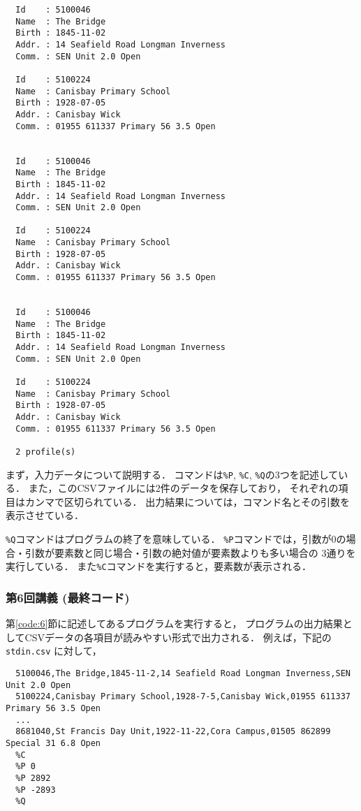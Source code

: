 \documentclass[autodetect-engine,dvi=dvipdfmx,ja=standard,
               a4j,11pt]{bxjsarticle}
\begin{document}
{\fontsize{10pt}{11pt} \selectfont
 \begin{verbatim}
  Id    : 5100046
  Name  : The Bridge
  Birth : 1845-11-02
  Addr. : 14 Seafield Road Longman Inverness
  Comm. : SEN Unit 2.0 Open

  Id    : 5100224
  Name  : Canisbay Primary School
  Birth : 1928-07-05
  Addr. : Canisbay Wick
  Comm. : 01955 611337 Primary 56 3.5 Open


  Id    : 5100046
  Name  : The Bridge
  Birth : 1845-11-02
  Addr. : 14 Seafield Road Longman Inverness
  Comm. : SEN Unit 2.0 Open

  Id    : 5100224
  Name  : Canisbay Primary School
  Birth : 1928-07-05
  Addr. : Canisbay Wick
  Comm. : 01955 611337 Primary 56 3.5 Open


  Id    : 5100046
  Name  : The Bridge
  Birth : 1845-11-02
  Addr. : 14 Seafield Road Longman Inverness
  Comm. : SEN Unit 2.0 Open

  Id    : 5100224
  Name  : Canisbay Primary School
  Birth : 1928-07-05
  Addr. : Canisbay Wick
  Comm. : 01955 611337 Primary 56 3.5 Open

  2 profile(s)
 \end{verbatim}
}

まず，入力データについて説明する．
コマンドは\verb|%P|, \verb|%C|, \verb|%Q|の3つを記述している．
また，このCSVファイルには2件のデータを保存しており，
それぞれの項目はカンマで区切られている．
出力結果については，コマンド名とその引数を表示させている．

\verb|%Q|コマンドはプログラムの終了を意味している．
\verb|%P|コマンドでは，引数が0の場合・引数が要素数と同じ場合・引数の絶対値が要素数よりも多い場合の
3通りを実行している．
また\verb|%C|コマンドを実行すると，要素数が表示される．

\subsubsection{第6回講義 (最終コード)}

第\ref{code:6}節に記述してあるプログラムを実行すると，
プログラムの出力結果としてCSVデータの各項目が読みやすい形式で出力される．
例えば，下記の \verb|stdin.csv| に対して，

{\fontsize{10pt}{11pt} \selectfont
 \begin{verbatim}
  5100046,The Bridge,1845-11-2,14 Seafield Road Longman Inverness,SEN Unit 2.0 Open
  5100224,Canisbay Primary School,1928-7-5,Canisbay Wick,01955 611337 Primary 56 3.5 Open
  ...
  8681040,St Francis Day Unit,1922-11-22,Cora Campus,01505 862899 Special 31 6.8 Open
  %C
  %P 0
  %P 2892
  %P -2893
  %Q
 \end{verbatim}
}
\end{document}
